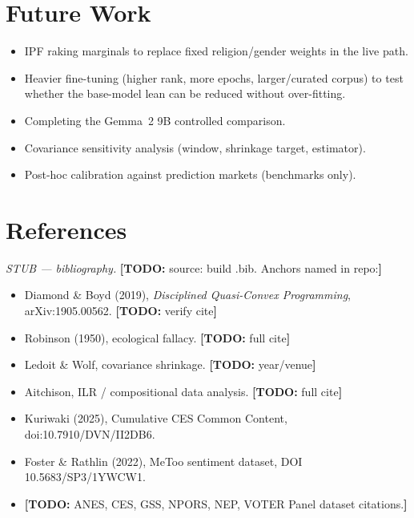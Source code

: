 \documentclass[11pt]{article}
\newcommand{\todo}[1]{{\color{red}\textbf{[TODO:} #1\textbf{]}}}
\newcommand{\stub}[1]{{\color{RoyalBlue}\emph{#1}}}
\begin{document}
\section{Future Work}
\begin{itemize}
  \item IPF raking marginals to replace fixed religion/gender weights in the
        live path.
  \item Heavier fine-tuning (higher rank, more epochs, larger/curated corpus) to
        test whether the base-model lean can be reduced without over-fitting.
  \item Completing the Gemma~2 9B controlled comparison.
  \item Covariance sensitivity analysis (window, shrinkage target, estimator).
  \item Post-hoc calibration against prediction markets (benchmarks only).
\end{itemize}

\section{References}
\stub{STUB --- bibliography.} \todo{source: build .bib. Anchors named in repo:}
\begin{itemize}
  \item Diamond \& Boyd (2019), \emph{Disciplined Quasi-Convex Programming},
        arXiv:1905.00562. \todo{verify cite}
  \item Robinson (1950), ecological fallacy. \todo{full cite}
  \item Ledoit \& Wolf, covariance shrinkage. \todo{year/venue}
  \item Aitchison, ILR / compositional data analysis. \todo{full cite}
  \item Kuriwaki (2025), Cumulative CES Common Content, doi:10.7910/DVN/II2DB6.
  \item Foster \& Rathlin (2022), MeToo sentiment dataset, DOI 10.5683/SP3/1YWCW1.
  \item \todo{ANES, CES, GSS, NPORS, NEP, VOTER Panel dataset citations.}
\end{itemize}
\end{document}
